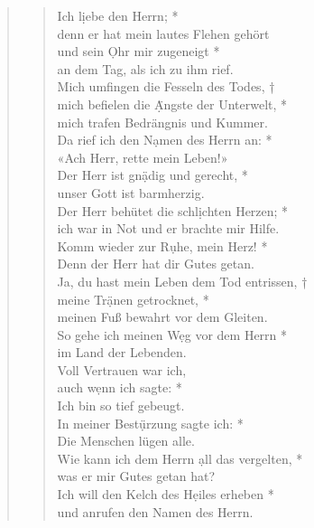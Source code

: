 
\vspace{0.6cm}


\begin{quote}
\begin{verse}
Ich l\d iebe den Herrn; *\\ 
denn er hat mein lautes Flehen gehört\\ 
\vin und sein \d Ohr mir zugeneigt *\\ 
\vin an dem Tag, als ich zu ihm rief.\\ 
Mich umfingen die Fesseln des Todes, †\\
mich befielen die \d Ängste der Unterwelt, *\\  
mich trafen Bedrängnis und Kummer.\\ 
\vin Da rief ich den N\d amen des Herrn an: *\\ 
\vin «Ach Herr, rette mein Leben!»\\
Der Herr ist gn\d ädig und gerecht, *\\ 
unser Gott ist barmherzig.\\ 
\vin Der Herr behütet die schl\d ichten Herzen; *\\ 
\vin ich war in Not und er brachte mir Hilfe.\\ 
Komm wieder zur R\d uhe, mein Herz! *\\ 
Denn der Herr hat dir Gutes getan.\\ 
\vin Ja, du hast mein Leben dem Tod entrissen, †\\ 
\vin meine Tr\d änen getrocknet, *\\ 
\vin  meinen Fuß bewahrt vor dem Gleiten.\\  
So gehe ich meinen W\d eg vor dem Herrn *\\ 
im Land der Lebenden.\\ 
\vin Voll Vertrauen war ich,\\ 
\vin auch w\d enn ich sagte: *\\ 
\vin Ich bin so tief gebeugt.\\ 
In meiner Best\d ürzung sagte ich: *\\ 
Die Menschen lügen alle.\\ 
\vin Wie kann ich dem Herrn \d all das vergelten, *\\ 
\vin was er mir Gutes getan hat?\\
Ich will den Kelch des H\d eiles erheben *\\ 
und anrufen den Namen des Herrn.\\ 

\end{verse}
\end{quote}
